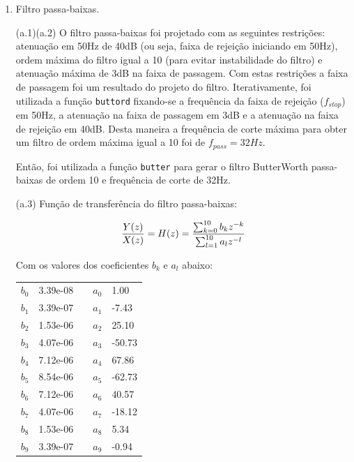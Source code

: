 \documentclass[12pt,letterpaper]{article}
\begin{document}
\begin{enumerate}[label=(\alph*)]  %
    \item Filtro passa-baixas.
    
    (a.1)(a.2) O filtro passa-baixas foi projetado com as seguintes restrições: atenuação em 50Hz de 40dB (ou seja, faixa de rejeição iniciando em 50Hz), ordem máxima do filtro igual a 10 (para evitar instabilidade do filtro) e atenuação máxima de 3dB na faixa de passagem. Com estas restrições a faixa de passagem foi um resultado do projeto do filtro. Iterativamente, foi utilizada a função \lstinline{buttord} fixando-se a frequência da faixa de rejeição ($f_{stop}$) em 50Hz, a atenuação na faixa de passagem em 3dB e a atenuação na faixa de rejeição em 40dB. Desta maneira a frequência de corte máxima para obter um filtro de ordem máxima igual a 10 foi de $f_{pass} = 32Hz$.
    
    Então, foi utilizada a função \lstinline{butter} para gerar o filtro ButterWorth passa-baixas de ordem 10 e frequência de corte de 32Hz.
    
    (a.3) Função de transferência do filtro passa-baixas:
    
    $${Y(z) \over X(z)} = H(z) =
        {
        { \sum_{k=0}^{10}{b_k z^{-k}} }
        \over
        { \sum_{l=1}^{10}{a_l z^{-l}} }
        }
    $$
    
    Com os valores dos coeficientes $b_k$ e $a_l$ abaixo:
    
    \begin{table}
    \centering
    \begin{tabular}{lllll}
        $b_{0}$ & 3.39e-08 & \space & $a_{0}$ & 1.00 \\ 
        $b_{1}$ & 3.39e-07 & \space & $a_{1}$ & -7.43 \\ 
        $b_{2}$ & 1.53e-06 & \space & $a_{2}$ & 25.10 \\ 
        $b_{3}$ & 4.07e-06 & \space & $a_{3}$ & -50.73 \\ 
        $b_{4}$ & 7.12e-06 & \space & $a_{4}$ & 67.86 \\ 
        $b_{5}$ & 8.54e-06 & \space & $a_{5}$ & -62.73 \\ 
        $b_{6}$ & 7.12e-06 & \space & $a_{6}$ & 40.57 \\ 
        $b_{7}$ & 4.07e-06 & \space & $a_{7}$ & -18.12 \\ 
        $b_{8}$ & 1.53e-06 & \space & $a_{8}$ & 5.34 \\ 
        $b_{9}$ & 3.39e-07 & \space & $a_{9}$ & -0.94 \\ 
    \end{tabular}
    \end{table}
    

\end{enumerate}
\end{document}
